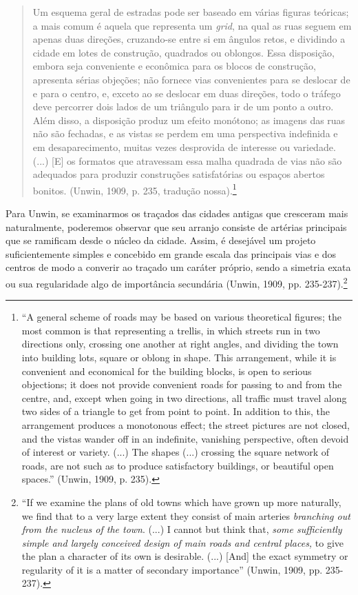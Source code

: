 \documentclass[12pt, a4paper]{book} %
\begin{document}
        \begin{quotation}
            Um esquema geral de estradas pode ser baseado em várias figuras teóricas; a mais comum é aquela que representa um \textit{grid}, na qual as ruas seguem em apenas duas direções, cruzando-se entre si em ângulos retos, e dividindo a cidade em lotes de construção, quadrados ou oblongos. Essa disposição, embora seja conveniente e econômica para os blocos de construção, apresenta sérias objeções; não fornece vias convenientes para se deslocar de e para o centro, e, exceto ao se deslocar em duas direções, todo o tráfego deve percorrer dois lados de um triângulo para ir de um ponto a outro. Além disso, a disposição produz um efeito monótono; as imagens das ruas não são fechadas, e as vistas se perdem em uma perspectiva indefinida e em desaparecimento, muitas vezes desprovida de interesse ou variedade. (...) [E] os formatos que atravessam essa malha quadrada de vias não são adequados para produzir construções satisfatórias ou espaços abertos bonitos. (Unwin, 1909, p. 235, tradução nossa).\footnote[72]{``A general scheme of roads may be based on various theoretical figures; the most common is that representing a trellis, in which streets run in two directions only, crossing one another at right angles, and dividing the town into building lots, square or oblong in shape. This arrangement, while it is convenient and economical for the building blocks, is open to serious objections; it does not provide convenient roads for passing to and from the centre, and, except when going in two directions, all traffic must travel along two sides of a triangle to get from point to point. In addition to this, the arrangement produces a monotonous effect; the street pictures are not closed, and the vistas wander off in an indefinite, vanishing perspective, often devoid of interest or variety. (...) The shapes (...) crossing the square network of roads, are not such as to produce satisfactory buildings, or beautiful open spaces.'' (Unwin, 1909, p. 235).}
        \end{quotation}

        Para Unwin, se examinarmos os traçados das cidades antigas que cresceram mais naturalmente, poderemos observar que seu arranjo consiste de artérias principais que se ramificam desde o núcleo da cidade. Assim, é desejável um projeto suficientemente simples e concebido em grande escala das principais vias e dos centros de modo a converir ao traçado um caráter próprio, sendo a simetria exata ou sua regularidade algo de importância secundária (Unwin, 1909, pp. 235-237).\footnote[73]{``If we examine the plans of old towns which have grown up more naturally, we find that to a very large extent they consist of main arteries \textit{branching out from the nucleus of the town}. (...) I cannot but think that, \textit{some sufficiently simple and largely conceived design of main roads and central places,} to give the plan a character of its own is desirable. (...) [And] the exact symmetry or regularity of it is a matter of secondary importance'' (Unwin, 1909, pp. 235-237).}
\end{document}
